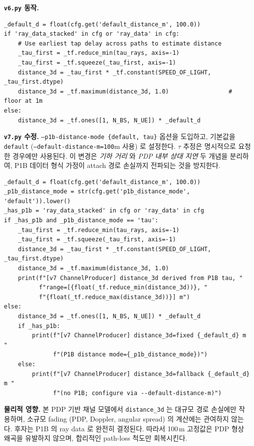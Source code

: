 \documentclass[11pt,a4paper]{article}
\newcommand{\vsix}{\texttt{v6.py}}
\newcommand{\vseven}{\texttt{v7.py}}
\begin{document}
\textbf{\vsix{} 동작.}
\begin{lstlisting}[caption={v6.py: lines 2004--2017}]
_default_d = float(cfg.get('default_distance_m', 100.0))
if 'ray_data_stacked' in cfg or 'ray_data' in cfg:
    # Use earliest tap delay across paths to estimate distance
    _tau_first = _tf.reduce_min(tau_rays, axis=-1)
    _tau_first = _tf.squeeze(_tau_first, axis=-1)
    distance_3d = _tau_first * _tf.constant(SPEED_OF_LIGHT, _tau_first.dtype)
    distance_3d = _tf.maximum(distance_3d, 1.0)                 # floor at 1m
else:
    distance_3d = _tf.ones([1, N_BS, N_UE]) * _default_d
\end{lstlisting}

\textbf{\vseven{} 수정.} \texttt{--p1b-distance-mode \{default, tau\}}
옵션을 도입하고, 기본값을 \texttt{default} (\texttt{--default-distance-m=100}m
사용) 로 설정한다. $\tau$ 추정은 명시적으로 요청한 경우에만 사용된다.
이 변경은 \textit{기하 거리} 와 \textit{PDP 내부 상대 지연} 두 개념을
분리하여, P1B 데이터 형식 가정이 attach 경로 손실까지 전파되는 것을
방지한다.

\begin{lstlisting}[caption={v7.py: lines 2051--2070}]
_default_d = float(cfg.get('default_distance_m', 100.0))
_p1b_distance_mode = str(cfg.get('p1b_distance_mode', 'default')).lower()
_has_p1b = 'ray_data_stacked' in cfg or 'ray_data' in cfg
if _has_p1b and _p1b_distance_mode == 'tau':
    _tau_first = _tf.reduce_min(tau_rays, axis=-1)
    _tau_first = _tf.squeeze(_tau_first, axis=-1)
    distance_3d = _tau_first * _tf.constant(SPEED_OF_LIGHT, _tau_first.dtype)
    distance_3d = _tf.maximum(distance_3d, 1.0)
    print(f"[v7 ChannelProducer] distance_3d derived from P1B tau, "
          f"range=[{float(_tf.reduce_min(distance_3d))}, "
          f"{float(_tf.reduce_max(distance_3d))}] m")
else:
    distance_3d = _tf.ones([1, N_BS, N_UE]) * _default_d
    if _has_p1b:
        print(f"[v7 ChannelProducer] distance_3d=fixed {_default_d} m "
              f"(P1B distance mode={_p1b_distance_mode})")
    else:
        print(f"[v7 ChannelProducer] distance_3d=fallback {_default_d} m "
              f"(no P1B; configure via --default-distance-m)")
\end{lstlisting}

\textbf{물리적 영향.} 본 PDP 기반 채널 모델에서 \texttt{distance\_3d} 는
대규모 경로 손실에만 작용하며, 소규모 fading (PDP, Doppler, angular
spread) 의 계산에는 관여하지 않는다. 후자는 P1B 의 ray data 로 완전히
결정된다. 따라서 100\,m 고정값은 PDP 형상 왜곡을 유발하지 않으며,
합리적인 path-loss 척도만 회복시킨다.
\end{document}
